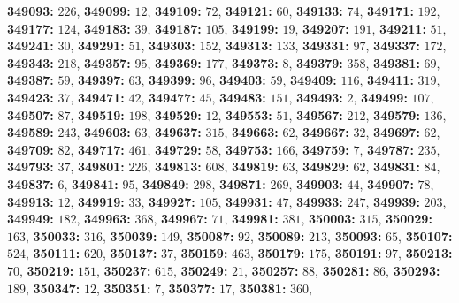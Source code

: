 \textsf{\bfseries 349093:} $226$, \textsf{\bfseries 349099:} $12$, \textsf{\bfseries 349109:} $72$, \textsf{\bfseries 349121:} $60$, \textsf{\bfseries 349133:} $74$, \textsf{\bfseries 349171:} $192$, \textsf{\bfseries 349177:} $124$, \textsf{\bfseries 349183:} $39$, \textsf{\bfseries 349187:} $105$, \textsf{\bfseries 349199:} $19$, \textsf{\bfseries 349207:} $191$, \textsf{\bfseries 349211:} $51$, \textsf{\bfseries 349241:} $30$, \textsf{\bfseries 349291:} $51$, \textsf{\bfseries 349303:} $152$, \textsf{\bfseries 349313:} $133$, \textsf{\bfseries 349331:} $97$, \textsf{\bfseries 349337:} $172$, \textsf{\bfseries 349343:} $218$, \textsf{\bfseries 349357:} $95$, \textsf{\bfseries 349369:} $177$, \textsf{\bfseries 349373:} $8$, \textsf{\bfseries 349379:} $358$, \textsf{\bfseries 349381:} $69$, \textsf{\bfseries 349387:} $59$, \textsf{\bfseries 349397:} $63$, \textsf{\bfseries 349399:} $96$, \textsf{\bfseries 349403:} $59$, \textsf{\bfseries 349409:} $116$, \textsf{\bfseries 349411:} $319$, \textsf{\bfseries 349423:} $37$, \textsf{\bfseries 349471:} $42$, \textsf{\bfseries 349477:} $45$, \textsf{\bfseries 349483:} $151$, \textsf{\bfseries 349493:} $2$, \textsf{\bfseries 349499:} $107$, \textsf{\bfseries 349507:} $87$, \textsf{\bfseries 349519:} $198$, \textsf{\bfseries 349529:} $12$, \textsf{\bfseries 349553:} $51$, \textsf{\bfseries 349567:} $212$, \textsf{\bfseries 349579:} $136$, \textsf{\bfseries 349589:} $243$, \textsf{\bfseries 349603:} $63$, \textsf{\bfseries 349637:} $315$, \textsf{\bfseries 349663:} $62$, \textsf{\bfseries 349667:} $32$, \textsf{\bfseries 349697:} $62$, \textsf{\bfseries 349709:} $82$, \textsf{\bfseries 349717:} $461$, \textsf{\bfseries 349729:} $58$, \textsf{\bfseries 349753:} $166$, \textsf{\bfseries 349759:} $7$, \textsf{\bfseries 349787:} $235$, \textsf{\bfseries 349793:} $37$, \textsf{\bfseries 349801:} $226$, \textsf{\bfseries 349813:} $608$, \textsf{\bfseries 349819:} $63$, \textsf{\bfseries 349829:} $62$, \textsf{\bfseries 349831:} $84$, \textsf{\bfseries 349837:} $6$, \textsf{\bfseries 349841:} $95$, \textsf{\bfseries 349849:} $298$, \textsf{\bfseries 349871:} $269$, \textsf{\bfseries 349903:} $44$, \textsf{\bfseries 349907:} $78$, \textsf{\bfseries 349913:} $12$, \textsf{\bfseries 349919:} $33$, \textsf{\bfseries 349927:} $105$, \textsf{\bfseries 349931:} $47$, \textsf{\bfseries 349933:} $247$, \textsf{\bfseries 349939:} $203$, \textsf{\bfseries 349949:} $182$, \textsf{\bfseries 349963:} $368$, \textsf{\bfseries 349967:} $71$, \textsf{\bfseries 349981:} $381$, \textsf{\bfseries 350003:} $315$, \textsf{\bfseries 350029:} $163$, \textsf{\bfseries 350033:} $316$, \textsf{\bfseries 350039:} $149$, \textsf{\bfseries 350087:} $92$, \textsf{\bfseries 350089:} $213$, \textsf{\bfseries 350093:} $65$, \textsf{\bfseries 350107:} $524$, \textsf{\bfseries 350111:} $620$, \textsf{\bfseries 350137:} $37$, \textsf{\bfseries 350159:} $463$, \textsf{\bfseries 350179:} $175$, \textsf{\bfseries 350191:} $97$, \textsf{\bfseries 350213:} $70$, \textsf{\bfseries 350219:} $151$, \textsf{\bfseries 350237:} $615$, \textsf{\bfseries 350249:} $21$, \textsf{\bfseries 350257:} $88$, \textsf{\bfseries 350281:} $86$, \textsf{\bfseries 350293:} $189$, \textsf{\bfseries 350347:} $12$, \textsf{\bfseries 350351:} $7$, \textsf{\bfseries 350377:} $17$, \textsf{\bfseries 350381:} $360$, 
